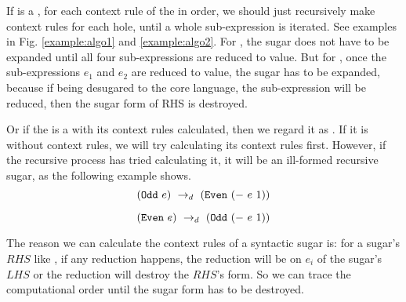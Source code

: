 If  is a , for each context rule of the  in order, we should just recursively make context rules for each hole, until a whole sub-expression is iterated. See examples in Fig.  \ref{example:algo1} and \ref{example:algo2}. For , the sugar does not have to be expanded until all four sub-expressions are reduced to value. But for , once the sub-expressions $e_1$ and $e_2$ are reduced to value, the sugar has to be expanded, because if being desugared to the core language, the sub-expression  will be reduced, then the sugar form of RHS is destroyed.


Or if the  is a  with its context rules calculated, then we regard it as . If it is without context rules, we will try calculating its context rules first. However, if the recursive process has tried calculating it, it will be an ill-formed recursive sugar, as the following example shows.
\[
(\mbox{\tt Odd}~e) ~\rightarrow_d~ (\mbox{\tt Even}~(-~e~1))
\]

\[
(\mbox{\tt Even}~e) ~\rightarrow_d~ (\mbox{\tt Odd}~(-~e~1))
\]

The reason we can calculate the context rules of a syntactic sugar is: for a sugar's $RHS$ like , if any reduction happens, the reduction will be on $e_i$ of the sugar's $LHS$ or the reduction will destroy the $RHS$'s form. So we can trace the computational order until the sugar form has to be destroyed.


